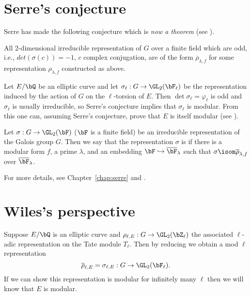 \documentclass{report}
\begin{document}
\section{Serre's conjecture}
 Serre has made the following conjecture which is {\em
  now a theorem} (see \cite{khare-wintenberger:serre1}).
\begin{conjecture}[Serre]
All 2-dimensional irreducible representation of
$G$ over a finite field which are odd, i.e., $det(\sigma(c))=-1$, $c$
complex conjugation, are of the form $\overline{\rho}_{\lambda,f}$
for some representation $\rho_{\lambda,f}$ constructed as above.
\end{conjecture}

\begin{example}
  Let $E/\bQ$ be an elliptic curve and let
  $\sigma_{\ell}:G\rightarrow\GL_2(\bF_{\ell})$ be the representation
  induced by the action of $G$ on the $\ell$-torsion of $E$. Then
  $\det \sigma_{\ell} = \varphi_{\ell}$ is odd and $\sigma_{\ell}$ is
  usually irreducible, so Serre's conjecture
  implies that $\sigma_{\ell}$ is modular. From this one can, assuming
  Serre's conjecture, prove that $E$ is itself modular (see
  \cite{ribet:abvars}).
\end{example}

\begin{definition}
  Let $\sigma:G\rightarrow \GL_2(\bF)$ ($\bF$ is a finite field) be an
  irreducible representation of the Galois group $G$. Then we say that
  the representation $\sigma$ is  if there is a modular
  form $f$, a prime $\lambda$, and an embedding $\bF\hookrightarrow
  \overline{\bF}_{\lambda}$ such that
  $\sigma\isom\overline{\rho}_{\lambda,f}$ over
  $\overline{\bF}_\lambda$.
\end{definition}

For more details, see Chapter~\ref{chap:serre}
and \cite{ribet-stein:serre}.

\section{Wiles's perspective}

Suppose $E/\bQ$ is an elliptic curve and
$\rho_{\ell,E}:G\rightarrow\GL_2(\bZ_{\ell})$
the associated $\ell$-adic representation on the
Tate module $T_{\ell}$. Then by reducing
we obtain a mod $\ell$ representation
$$\overline{\rho}_{\ell,E}=\sigma_{\ell,E}:G
\rightarrow \GL_2(\bF_{\ell}).$$
If we can show this representation is modular for infinitely many $\ell$
then we will know that $E$ is modular.
\end{document}
